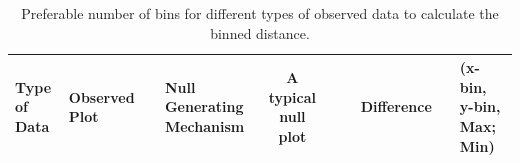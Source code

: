 \documentclass[12]{article}
\begin{document}
\begin{table}[hbtp]
\caption{Preferable number of bins for different types of observed data to calculate the binned distance.}
\centering 
\begin{tabular}{p{1.5cm}l c  p{2cm} c cc l c p{4cm}} 
\hline
 Type of Data & Observed Plot && Null Generating Mechanism & A typical null plot && & Difference && (x-bin, y-bin, Max; Min) \\ %
 \hline

\end{tabular}
\end{table}
\end{document}

